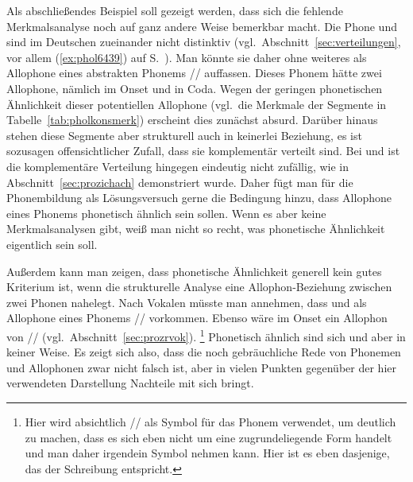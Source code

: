 Als abschließendes Beispiel soll gezeigt werden, dass sich die fehlende Merk\-mals\-ana\-lyse noch auf ganz andere Weise bemerkbar macht.
Die Phone \textipa{[h]} und \textipa{[N]} sind im Deutschen zueinander nicht distinktiv (vgl.\ Abschnitt~\ref{sec:verteilungen}, vor allem (\ref{ex:phol6439}) auf S.~\pageref{ex:phol6439}).
Man könnte sie daher ohne weiteres als Allophone eines abstrakten Phonems // auffassen.
Dieses Phonem hätte zwei Allophone, nämlich \textipa{[h]} im Onset und \textipa{[N]} in Coda.
Wegen der geringen phonetischen Ähnlichkeit dieser potentiellen Allophone (vgl.\ die Merkmale der Segmente in Tabelle~\ref{tab:pholkonsmerk}) erscheint dies zunächst absurd.
Darüber hinaus stehen diese Segmente aber strukturell auch in keinerlei Beziehung, es ist sozusagen offensichtlicher Zufall, dass sie komplementär verteilt sind.
Bei \textipa{[\c{c}]} und \textipa{[X]} ist die komplementäre Verteilung hingegen eindeutig nicht zufällig, wie in Abschnitt~\ref{sec:prozichach} demonstriert wurde.
Daher fügt man für die Phonembildung als Lösungsversuch gerne die Bedingung hinzu, dass Allophone eines Phonems phonetisch ähnlich sein sollen.
Wenn es aber keine Merkmalsanalysen gibt, weiß man nicht so recht, was phonetische Ähnlichkeit eigentlich sein soll.

Außerdem kann man zeigen, dass phonetische Ähnlichkeit generell kein gutes Kriterium ist, wenn die strukturelle Analyse eine Allophon-Beziehung zwischen zwei Phonen nahelegt.
Nach Vokalen müsste man \zB annehmen, dass \textipa{[@]} und \textipa{[5]} als Allophone eines Phonems // vorkommen.
Ebenso wäre im Onset \textipa{[K]} ein Allophon von // (vgl.\ Abschnitt~\ref{sec:prozrvok}).%
\footnote{Hier wird absichtlich // als Symbol für das Phonem verwendet, um deutlich zu machen, dass es sich eben nicht um eine zugrundeliegende Form handelt und man daher irgendein Symbol nehmen kann.
Hier ist es eben dasjenige, das der Schreibung entspricht.}
Phonetisch ähnlich sind sich \textipa{[@]} und \textipa{[K]} aber in keiner Weise.
Es zeigt sich also, dass die noch gebräuchliche Rede von Phonemen und Allophonen zwar nicht falsch ist, aber in vielen Punkten gegenüber der hier verwendeten Darstellung Nachteile mit sich bringt.

\Zusammenfassung

